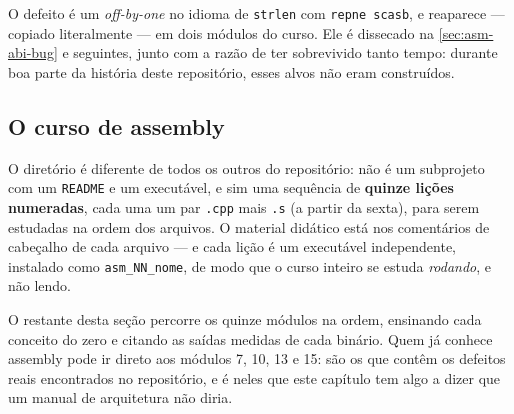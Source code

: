 O defeito é um \emph{off-by-one} no idioma de \texttt{strlen} com
\texttt{repne scasb}, e reaparece --- copiado literalmente --- em dois módulos
do curso. Ele é dissecado na \cref{sec:asm-abi-bug} e seguintes, junto com a
razão de ter sobrevivido tanto tempo: durante boa parte da história deste
repositório, esses alvos não eram construídos.

\subsection{O curso de assembly}
\label{sec:asm-course}

O diretório  é diferente de todos os outros do repositório:
não é um subprojeto com um \texttt{README} e um executável, e sim uma sequência
de \textbf{quinze lições numeradas}, cada uma um par \texttt{.cpp} mais
\texttt{.s} (a partir da sexta), para serem estudadas na ordem dos arquivos. O
material didático está nos comentários de cabeçalho de cada arquivo --- e cada
lição é um executável independente, instalado como \texttt{asm\_NN\_nome}, de
modo que o curso inteiro se estuda \emph{rodando}, e não lendo.

O restante desta seção percorre os quinze módulos na ordem, ensinando cada
conceito do zero e citando as saídas medidas de cada binário. Quem já conhece
assembly pode ir direto aos módulos 7, 10, 13 e 15: são os que contêm os
defeitos reais encontrados no repositório, e é neles que este capítulo tem algo
a dizer que um manual de arquitetura não diria.

